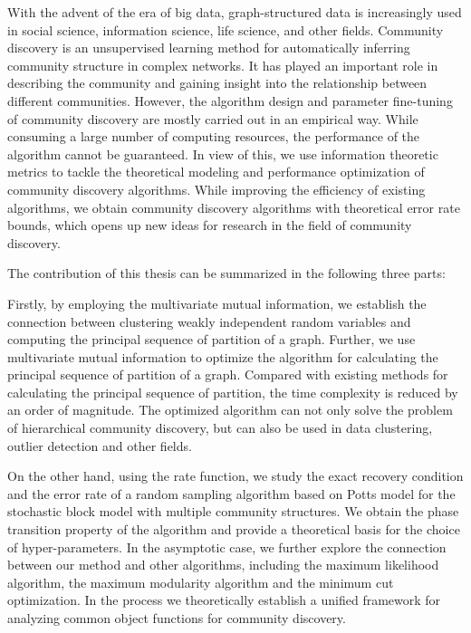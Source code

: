\begin{abstract*}
  With the advent of the era of big data, graph-structured data is increasingly used in
  social science, information science, life science, and other fields.
  Community discovery is an unsupervised learning method for automatically inferring community structure
  in complex networks.
  It has played an important role in describing the community and gaining insight into the relationship between different communities.
  However, the algorithm design and parameter fine-tuning of community discovery are mostly carried out in an empirical way.
  While consuming a large number of computing resources,
  the performance of the algorithm cannot be guaranteed.
  In view of this,
  we use information theoretic metrics to tackle the theoretical modeling and performance optimization of community discovery algorithms.
  While improving the efficiency of existing algorithms, we obtain community discovery algorithms with theoretical error rate bounds,
  which opens up new ideas for research in the field of community discovery.

  The contribution of this thesis can be summarized in the following three parts:

  Firstly, by employing the multivariate mutual information,
  we establish the connection between clustering weakly independent random variables and computing the principal sequence of partition
  of a graph.
  Further, we use multivariate mutual information to optimize the algorithm for calculating the principal sequence of partition of a graph.
  Compared with existing methods for calculating the principal sequence of partition,
  the time complexity is reduced by an order of magnitude.
  The optimized algorithm can not only solve the problem of hierarchical community discovery, but can also be used in data clustering, outlier detection and other fields.

  On the other hand, using the rate function,
  we study the exact recovery condition and the error rate of a random sampling algorithm based on Potts model
  for the stochastic block model with multiple community structures.
  We obtain the phase transition property of the algorithm and provide a theoretical basis
  for the choice of hyper-parameters.
  In the asymptotic case, we further explore the connection between our method and other algorithms, including the maximum likelihood algorithm, the maximum modularity algorithm and the minimum cut optimization.
  In the process we theoretically establish a unified framework for analyzing common object functions for community discovery.


\end{abstract*}
